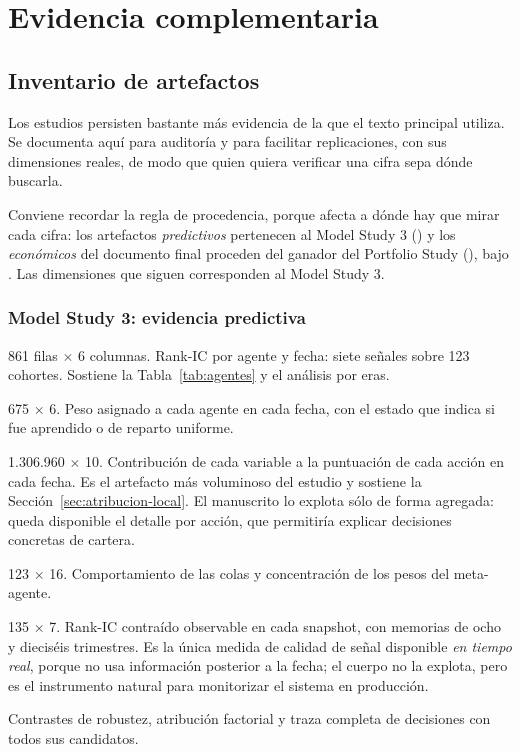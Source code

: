 \chapter{Evidencia complementaria}
\label{anexo:evidencia}

\section{Inventario de artefactos}

Los estudios persisten bastante más evidencia de la que el texto principal utiliza. Se documenta
aquí para auditoría y para facilitar replicaciones, con sus dimensiones reales, de modo que quien
quiera verificar una cifra sepa dónde buscarla.

Conviene recordar la regla de procedencia, porque afecta a dónde hay que mirar cada cifra: los
artefactos \emph{predictivos} pertenecen al Model Study 3 (\studyidC) y los \emph{económicos} del
documento final proceden del ganador del Portfolio Study (\studyportfolio), bajo
. Las dimensiones que siguen corresponden al Model Study 3.

\subsection*{Model Study 3: evidencia predictiva}

\begin{description}[leftmargin=0.5cm,style=nextline,font=\normalfont\ttfamily\small]
  \item[evidence/rank\_ic\_diagnostics.parquet] 861 filas $\times$ 6 columnas. Rank-IC por agente y
  fecha: siete señales sobre 123 cohortes. Sostiene la Tabla~\ref{tab:agentes} y el análisis por
  eras.
  \item[evidence/meta\_weights.parquet] 675 $\times$ 6. Peso asignado a cada agente en cada fecha,
  con el estado que indica si fue aprendido o de reparto uniforme.
  \item[evidence/agent\_local\_attribution.parquet] 1.306.960 $\times$ 10. Contribución de cada
  variable a la puntuación de cada acción en cada fecha. Es el artefacto más voluminoso del estudio
  y sostiene la Sección~\ref{sec:atribucion-local}. El manuscrito lo explota sólo de forma agregada:
  queda disponible el detalle por acción, que permitiría explicar decisiones concretas de cartera.
  \item[evidence/rank\_tail\_diagnostics.parquet] 123 $\times$ 16. Comportamiento de las colas y
  concentración de los pesos del meta-agente.
  \item[evidence/signal\_health.parquet] 135 $\times$ 7. Rank-IC contraído observable en cada
  snapshot, con memorias de ocho y dieciséis trimestres. Es la única medida de calidad de señal
  disponible \emph{en tiempo real}, porque no usa información posterior a la fecha; el cuerpo no la
  explota, pero es el instrumento natural para monitorizar el sistema en producción.
  \item[robustness.json, attribution.json, decisions.json] Contrastes de robustez, atribución
  factorial y traza completa de decisiones con todos sus candidatos.
\end{description}

